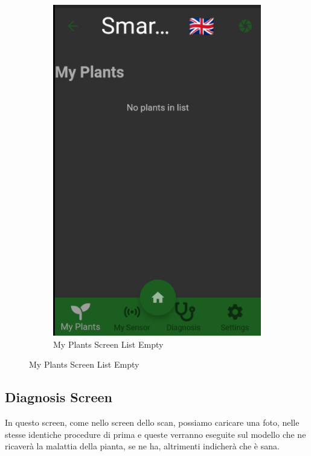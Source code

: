 \documentclass[a4paper,12pt]{report}
\begin{document}
\begin{figure}[H]
\begin{subfigure}{0.3\textwidth}
		\includegraphics[width=\textwidth]{./images/my_plants/my_plants_screen.png}
		\caption{My Plants Screen List Empty}
		\label{fig:my_plants_list_empty}
	\end{subfigure}
\end{figure}

\subsection{Diagnosis Screen}

\textsf{\small In questo screen, come nello screen dello scan, possiamo caricare una foto, nelle stesse identiche procedure di prima e queste verranno eseguite sul modello che ne ricaverà la malattia della pianta, se ne ha, altrimenti indicherà che è sana.}
\end{document}
